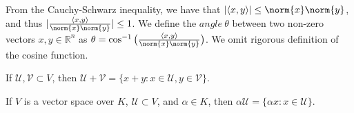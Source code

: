 \documentclass[crop=false,class=book,oneside]{standalone}
\begin{document}
            \begin{remark}
            From the Cauchy-Schwarz inequality, we have that $|\langle x,y \rangle| \leq \norm{x}\norm{y}$, and thus $|\frac{\langle x,y \rangle}{\norm{x}\norm{y}}| \leq 1$. We define the $angle\ \theta$ between two non-zero vectors $x,y\in \mathbb{R}^n$ as $\theta=\cos^{-1}\big(\frac{\langle x,y \rangle}{\norm{x}\norm{y}}\big)$. We omit rigorous definition of the cosine function.
            \end{remark}
            \begin{definition}
            If $\mathcal{U},\mathcal{V}\subset V$, then $\mathcal{U}+\mathcal{V} = \{x+y:x\in \mathcal{U},y\in \mathcal{V}\}$.
            \end{definition}
            \begin{definition}
            If $V$ is a vector space over $K$, $\mathcal{U}\subset V$, and $\alpha \in K$, then $\alpha \mathcal{U} = \{\alpha x:x\in \mathcal{U}\}$.
            \end{definition}
\end{document}
